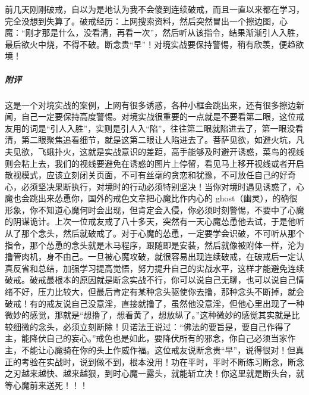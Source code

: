 \begin{case}
    前几天刚刚破戒，自以为是地认为我不会傻到连续破戒，而且一直以来都在学习，完全没想到失算了。破戒经历：上网搜索资料，然后突然冒出一个擦边图，心魔：“刚才那是什么，没看清，再看一次”，然后听从该指令，结果渐渐引人入胜，最后欲火中烧，不得不破。断念贵“早”！对境实战要保持警惕，稍有欣羡，便趋欲境！
    \subparagraph{附评} 这是一个对境实战的案例，上网有很多诱惑，各种小框会跳出来，还有很多擦边新闻，自己一定要保持高度警惕。对境实战很重要的一点就是不要看第二眼，这位戒友用的词是“引人入胜”，实则是引人入“陷”，往往第二眼就陷进去了，第一眼没看清，第二眼聚焦追看细节，就是这第二眼让人陷进去了。菩萨见欲，如避火坑，凡夫见欲，飞蛾扑火，这就是实战意识的差距，高手能够及时避开诱惑，菜鸟的视线则会粘上去，我们的视线要避免在诱惑的图片上停留，看见马上移开视线或者开启散视模式，应该立刻闭关页面，不可有丝毫的贪恋和犹豫，不可放任自己的好奇心，必须坚决果断执行，对境时的行动必须特别坚决！当你对境时遇见诱惑了，心魔也会跳出来怂恿你，国外的戒色文章把心魔比作内心的 ghost（幽灵），的确很形象，你不知道心魔何时会出现，但肯定会入侵，你必须时刻警惕，不要中了心魔的阴谋诡计。上次一位戒友戒了八十多天，突然有一天心魔怂恿他去试，于是他听从了那个念头，然后就破戒了。对于心魔的怂恿，一定要学会识破，不可听从那个指令，那个怂恿的念头就是木马程序，跟随即是安装，然后就像被附体一样，沦为撸管肉机，身不由己。一旦被心魔攻破，就很容易出现连续破戒，在破戒后一定认真反省和总结，加强学习提高觉悟，努力提升自己的实战水平，这样才能避免连续破戒。破戒最根本的原因就是断念实战不行，你可以说自己无聊，也可以说自己情绪不好，压力比较大，但最后肯定有某种念头驱使你去撸，那种念头不断掉，就会破戒！有的戒友说自己没意淫，直接就撸了，虽然他没意淫，但他心里出现了一种微妙的感觉，那就是“想撸了，想看黄了，想放纵了。”这种微妙的感觉其实就是比较细微的念头，必须立刻断除！贝诺法王说过：“佛法的要旨是，要自己作得了主，能降伏自己的妄心。”戒色也是如此，要降伏所有的邪念，你自己必须当家作主，不能让心魔骑在你的头上作威作福。这位戒友说断念贵“早”，说得很对！但真正的考验在实战时，说到做不到，根本没用！功在平时，平时不断练习断念，断念之刃越来越快、越来越狠，到时心魔一露头，就能斩立决！你这里就是断头台，就等心魔前来送死！！！
\end{case}

